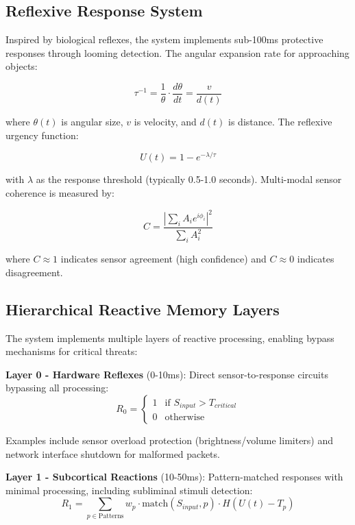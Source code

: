 \documentclass[11pt,letterpaper]{article}
\begin{document}
\subsection{Reflexive Response System}

Inspired by biological reflexes, the system implements sub-100ms protective responses through looming detection. The angular expansion rate for approaching objects:

\begin{equation}
\tau^{-1} = \frac{1}{\theta} \cdot \frac{d\theta}{dt} = \frac{v}{d(t)}
\end{equation}

where $\theta(t)$ is angular size, $v$ is velocity, and $d(t)$ is distance. The reflexive urgency function:

\begin{equation}
U(t) = 1 - e^{-\lambda/\tau}
\end{equation}

with $\lambda$ as the response threshold (typically 0.5-1.0 seconds). Multi-modal sensor coherence is measured by:

\begin{equation}
C = \frac{|\sum_{i} A_i e^{i\phi_i}|^2}{\sum_{i} A_i^2}
\end{equation}

where $C \approx 1$ indicates sensor agreement (high confidence) and $C \approx 0$ indicates disagreement.

\subsection{Hierarchical Reactive Memory Layers}

The system implements multiple layers of reactive processing, enabling bypass mechanisms for critical threats:

\textbf{Layer 0 - Hardware Reflexes} (0-10ms): Direct sensor-to-response circuits bypassing all processing:
\begin{equation}
R_0 = \begin{cases}
1 & \text{if } S_{input} > T_{critical} \\
0 & \text{otherwise}
\end{cases}
\end{equation}

Examples include sensor overload protection (brightness/volume limiters) and network interface shutdown for malformed packets.

\textbf{Layer 1 - Subcortical Reactions} (10-50ms): Pattern-matched responses with minimal processing, including subliminal stimuli detection:
\begin{equation}
R_1 = \sum_{p \in \text{Patterns}} w_p \cdot \text{match}(S_{input}, p) \cdot H(U(t) - T_p)
\end{equation}
\end{document}
